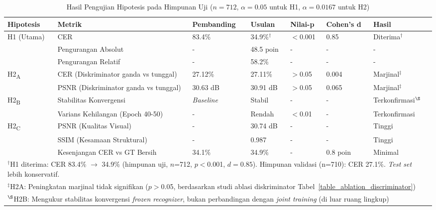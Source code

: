 \documentclass[journal]{IEEEtran}
\begin{document}
\begin{table}[!t]
\renewcommand{\arraystretch}{1.2}
\caption{Hasil Pengujian Hipotesis pada Himpunan Uji ($n=712$, $\alpha=0.05$ untuk H1, $\alpha=0.0167$ untuk H2)\protect\footnotemark}
\label{table_hypothesis_test}
\centering
\scriptsize
\begin{tabular}{|p{1.5cm}|p{1.8cm}|p{1.3cm}|p{1.3cm}|p{1cm}|p{0.9cm}|p{1.2cm}|}
\hline
\textbf{Hipotesis} & \textbf{Metrik} & \textbf{Pembanding} & \textbf{Usulan} & \textbf{Nilai-p} & \textbf{Cohen's d} & \textbf{Hasil} \\
\hline
H1 (Utama) & CER & 83.4\% & 34.9\%$^\dagger$ & $<$0.001 & 0.85 & Diterima$^\dagger$ \\
& Pengurangan Absolut & - & 48.5 poin & - & - & - \\
& Pengurangan Relatif & - & 58.2\% & - & - & - \\
\hline
H2\textsubscript{A} & CER (Diskriminator ganda vs tunggal) & 27.12\% & 27.11\% & $>$0.05 & 0.004 & Marjinal$^\ddagger$ \\
& PSNR (Diskriminator ganda vs tunggal) & 30.63 dB & 30.91 dB & $>$0.05 & 0.065 & Marjinal$^\ddagger$ \\
\hline
H2\textsubscript{B} & Stabilitas Konvergensi & \textit{Baseline} & Stabil & - & - & Terkonfirmasi$^\S$ \\
& Varians Kehilangan (Epoch 40-50) & - & Rendah & $<$0.01 & - & Terkonfirmasi \\
\hline
H2\textsubscript{C} & PSNR (Kualitas Visual) & - & 30.74 dB & - & - & Tinggi \\
& SSIM (Kesamaan Struktural) & - & 0.987 & - & - & Tinggi \\
& Kesenjangan CER vs GT Bersih & 34.1\% & 34.9\% & - & 0.8 poin & Minimal \\
\hline
\multicolumn{7}{|l|}{\footnotesize $^\dagger$H1 diterima: CER 83.4\% $\rightarrow$ 34.9\% (himpunan uji, $n$=712, $p<$0.001, $d=0.85$). Himpunan validasi (n=710): CER 27.1\%. \textit{Test set} lebih konservatif.} \\
\multicolumn{7}{|l|}{\footnotesize $^\ddagger$H2A: Peningkatan marjinal tidak signifikan ($p>$0.05, berdasarkan studi ablasi diskriminator Tabel~\ref{table_ablation_discriminator})} \\
\multicolumn{7}{|l|}{\footnotesize $^\S$H2B: Mengukur stabilitas konvergensi \textit{frozen recognizer}, bukan perbandingan dengan \textit{joint training} (di luar ruang lingkup)} \\
\hline
\end{tabular}
\end{table}
\end{document}

